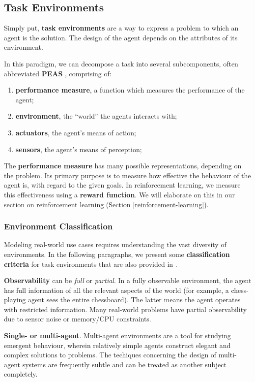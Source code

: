 \subsection{Task Environments}
Simply put, \textbf{task environments} are a way to express a problem to which an agent is the solution.
The design of the agent depends on the attributes of its environment.

In this paradigm, we can decompose a task into several subcomponents, often abbreviated \textbf{PEAS} \cite{aima}, comprising of:
\begin{enumerate}
    \item \textbf{performance measure}, a function which measures the performance of the agent;
    \item \textbf{environment}, the ``world'' the agents interacts with;
    \item \textbf{actuators}, the agent's means of action;
    \item \textbf{sensors}, the agent's means of perception;
\end{enumerate}

The \textbf{performance measure} has many possible representations, depending on the problem.
Its primary purpose is to measure how effective the behaviour of the agent is, with regard to the given goals.
In reinforcement learning, we measure this effectiveness using a \textbf{reward function}.
We will elaborate on this in our section on reinforcement learning (Section \ref{reinforcement-learning}).

\subsubsection{Environment Classification}

Modeling real-world use cases requires understanding the vast diversity of environments.
In the following paragraphs, we present some \textbf{classification criteria} for task environments that are also provided in \cite{aima}.

\textbf{Observability} can be \emph{full} or \emph{partial}.
In a fully observable environment, the agent has full information of all the relevant aspects of the world (for example, a chess-playing agent sees the entire chessboard).
The latter means the agent operates with restricted information.
Many real-world problems have partial observability due to sensor noise or memory/CPU constraints.

\textbf{Single- or multi-agent}.
Multi-agent environments are a tool for studying emergent behaviour, wherein relatively simple agents construct elegant and complex solutions to problems.
The techiques concerning the design of multi-agent systems are frequently subtle and can be treated as another subject completely.

